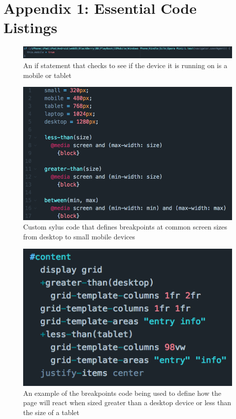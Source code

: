 \documentclass[draftclsnofoot,onecolumn,letterpaper,10pt]{IEEEtran}
\begin{document}
\section{Appendix 1: Essential Code Listings}

\begin{figure}[H]
	\centering
	\includegraphics[width=7in]{./code/device_check.png}
	\caption{An if statement that checks to see if the device it is running on is a mobile or tablet}
\end{figure}

\begin{figure}[H]
	\centering
	\includegraphics[scale=.3]{./code/breakpoints.png}
	\caption{Custom sylus code that defines breakpoints at common screen sizes from desktop to small mobile devices}
\end{figure}

\begin{figure}[H]
	\centering
	\includegraphics[scale=.3]{./code/breakpoints_example.png}
	\caption{An example of the breakpoints code being used to define how the page will react when sized greater than a desktop device or less than the size of a tablet}
\end{figure}
\end{document}
